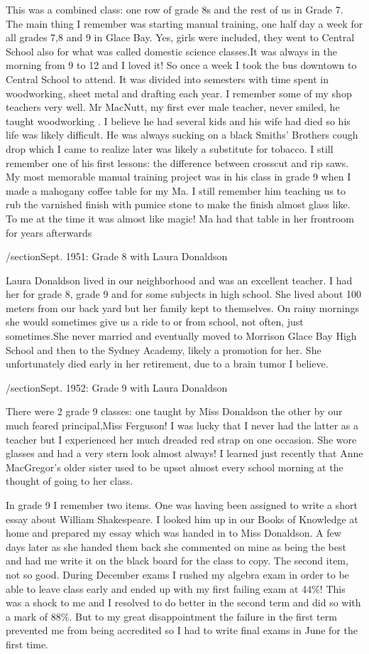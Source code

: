 This was a combined class: one row of grade 8s and the rest of us in Grade 7. The main thing I remember was starting manual training, one half day a week for all grades 7,8 and 9 in Glace Bay. Yes, girls were included, they went to Central School also for what was called domestic science classes.It was always in the morning from 9 to 12 and I loved it! So once a week I took the bus downtown to Central School to attend. It was divided into semesters with time spent in woodworking, sheet metal and drafting each year. I remember some of my shop teachers very well. Mr MacNutt, my first ever male teacher, never smiled, he taught woodworking . I believe he had several kids and his wife had died so his life was likely difficult. He was always sucking on a black Smiths' Brothers cough drop which I came to realize later was likely a substitute for tobacco. I still remember one of his first lessons: the difference between crosscut and rip saws. My most memorable manual training project was in his class in grade 9 when I made a mahogany coffee table for my Ma. I still remember him teaching us to rub the varnished finish with pumice stone to make the finish almost glass like. To me at the time it was almost like magic! Ma had that table in her frontroom for years afterwards

/section{Sept. 1951: Grade 8 with Laura Donaldson}

Laura Donaldson lived in our neighborhood and was an excellent teacher. I had her for grade 8, grade 9 and for some subjects in high school. She lived about 100 meters from our back yard but her family kept to themselves. On rainy mornings she would sometimes give us a ride to or from school, not often, just sometimes.She never married and eventually moved to Morrison Glace Bay High School and then to the Sydney Academy, likely a promotion for her. She unfortunately died early in her retirement, due to a brain tumor I believe.

/section{Sept. 1952: Grade 9 with Laura Donaldson}

There were 2 grade 9 classes: one taught by Miss Donaldson the other by our much feared principal,Miss Ferguson! I was lucky that I never had the latter as a teacher but I experienced her much dreaded red strap on one occasion. She wore glasses and had a very stern look almost always! I learned just recently that Anne MacGregor's older sister used to be upset almost every school morning at the thought of going to her class.

In grade 9 I remember two items. One was having been assigned to write a short essay about William Shakespeare. I looked him up in our Books of Knowledge at home and prepared my essay which was handed in to Miss Donaldson. A few days later as she handed them back she commented on mine as being the best and had me write it on the black board for the class to copy. The second item, not so good. During December exams I rushed my algebra exam in order to be able to leave class early and ended up with my first failing exam at 44\%! This was a shock to me and I resolved to do better in the second term and did so with a mark of 88\%. But to my great disappointment the failure in the first term prevented me from being accredited so I had to write final exams in June for the first time.

